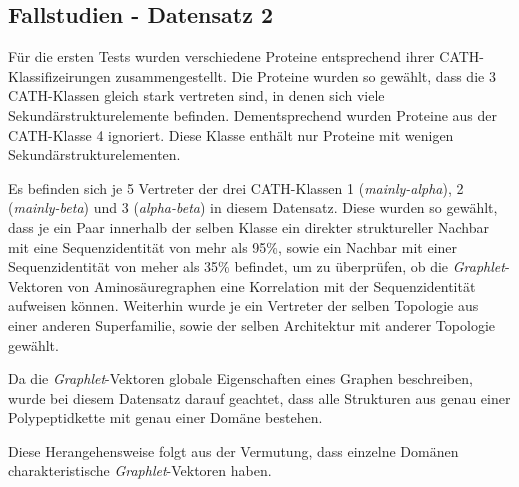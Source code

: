 \documentclass{report}
\begin{document}
\subsection{Fallstudien  - Datensatz 2} 

F\"ur die ersten Tests wurden verschiedene Proteine entsprechend ihrer CATH-Klassifizeirungen zusammengestellt. Die Proteine wurden so gew\"ahlt, dass die 3 CATH-Klassen gleich stark vertreten sind, in denen sich viele Sekund\"arstrukturelemente befinden. Dementsprechend wurden Proteine aus der CATH-Klasse 4 ignoriert. Diese Klasse enth\"alt nur Proteine mit wenigen Sekund\"arstrukturelementen.

Es befinden sich je 5 Vertreter der drei CATH-Klassen 1 (\textit{mainly-alpha}), 2 (\textit{mainly-beta}) und 3 (\textit{alpha-beta}) in diesem Datensatz. Diese wurden so gew\"ahlt, dass je ein Paar innerhalb der selben Klasse ein direkter struktureller Nachbar mit eine Sequenzidentit\"at von mehr als 95\%, sowie ein Nachbar mit einer Sequenzidentit\"at von meher als 35\% befindet, um zu \"uberpr\"ufen, ob die \textit{Graphlet}-Vektoren von Aminos\"auregraphen eine Korrelation mit der Sequenzidentit\"at aufweisen k\"onnen.
Weiterhin wurde je ein Vertreter der selben Topologie aus einer anderen Superfamilie, sowie der selben Architektur mit anderer Topologie gew\"ahlt.
 
Da die \textit{Graphlet}-Vektoren globale Eigenschaften eines Graphen beschreiben, wurde bei diesem Datensatz darauf geachtet, dass alle Strukturen aus genau einer Polypeptidkette mit genau einer Dom\"ane bestehen.

Diese Herangehensweise folgt aus der Vermutung, dass einzelne Dom\"anen charakteristische \textit{Graphlet}-Vektoren haben. 
\\
\end{document}
